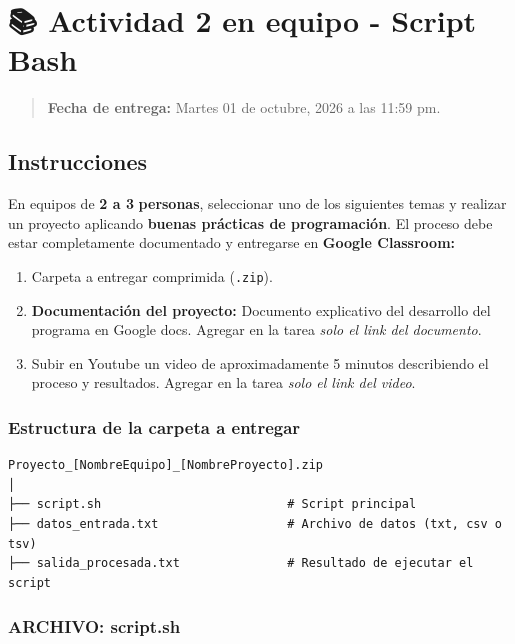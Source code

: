 \documentclass[
  spanish,
  12pt,
  letterpaper,
  DIV=11,
  numbers=noendperiod]{scrreprt}
\providecommand{\tightlist}{%
  \setlength{\itemsep}{0pt}\setlength{\parskip}{0pt}}
\begin{document}
\chapter{\texorpdfstring{\textbf{📚 Actividad 2 en equipo -} Script
Bash}{📚 Actividad 2 en equipo - Script Bash}}\label{actividad-2-en-equipo---script-bash}

\begin{quote}
\textbf{Fecha de entrega:} Martes 01 de octubre, 2026 a las 11:59 pm.
\end{quote}

\section{Instrucciones}\label{instrucciones}

En equipos de \textbf{2 a 3} \textbf{personas}, seleccionar uno de los
siguientes temas y realizar un proyecto aplicando \textbf{buenas
prácticas de programación}. El proceso debe estar completamente
documentado y entregarse en \textbf{Google Classroom:}

\begin{enumerate}
\def\labelenumi{\arabic{enumi}.}
\tightlist
\item
  Carpeta a entregar comprimida (\texttt{.zip}).
\item
  \textbf{Documentación del proyecto:} Documento explicativo del
  desarrollo del programa en Google docs. Agregar en la tarea \emph{solo
  el link del documento}.
\item
  Subir en Youtube un video de aproximadamente 5 minutos describiendo el
  proceso y resultados. Agregar en la tarea \emph{solo el link del
  video}.
\end{enumerate}

\subsection{Estructura de la carpeta a
entregar}\label{estructura-de-la-carpeta-a-entregar}

\begin{verbatim}
Proyecto_[NombreEquipo]_[NombreProyecto].zip
│
├── script.sh                          # Script principal
├── datos_entrada.txt                  # Archivo de datos (txt, csv o tsv)
├── salida_procesada.txt               # Resultado de ejecutar el script
\end{verbatim}

\subsection{ARCHIVO: script.sh 🔧}\label{archivo-script.sh}
\end{document}
